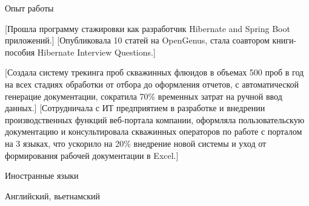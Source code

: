 \documentclass[10pt,a4paper,oneside]{letter} %
\begin{document}
	\begin{resumeSection}{Опыт работы}

			[Прошла программу стажировки как разработчик Hibernate and Spring Boot приложений.]
			[Опубликовала 10 статей на OpenGenus, стала соавтором книги-пособия Hibernate Interview Questions.]

			[Создала систему трекинга проб скважинных флюидов в объемах 500 проб в год на всех стадиях обработки от отбора до оформления отчетов, с автоматической генерацие документации, сократила 70\% временных затрат на ручной ввод данных.]
			[Сотрудничала с ИТ предприятием в разработке и внедрении производственных функций веб-портала компании, оформляла пользовательскую документацию и консультировала скважинных операторов по работе с порталом на 3 языках, что ускорило на 20\% внедрение новой системы и уход от формирования рабочей документации в Excel.]


	\end{resumeSection}
	
	\begin{resumeSection}{Иностранные языки}

		Английский, вьетнамский
	\end{resumeSection}
	
\end{document}
